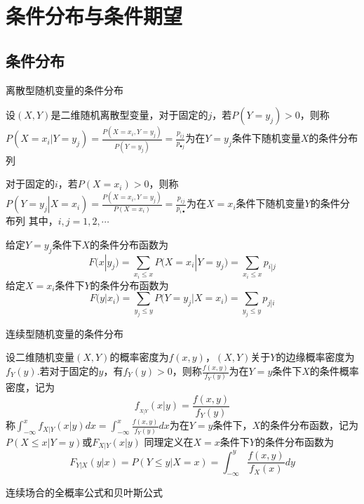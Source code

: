 \section{条件分布与条件期望}
\subsection{条件分布}
离散型随机变量的条件分布
\begin{definition}
    设$(X,Y)$是二维随机离散型变量，对于固定的$j$，若$P(Y=y_j)>0$，则称
$P( \left. {X = {x_i}} \right|Y = {y_j})  = \frac{ P( X = {x_i},Y = {y_j}) }{P( Y = {y_j}) } = \frac{ p_{ij} }{ p_{ \bullet j} }$为在$Y=y_j$条件下随机变量$X$的条件分布列
\end{definition}

对于固定的$i$，若$P(X=x_i)>0$，则称
$P( \left. {Y = {y_j}} \right|X = {x_i})  = \frac{ P( X = {x_i},Y = {y_j}) }{P( X = {x_i}) } = \frac{ p_{ij} }{ p_{ i \bullet} }$为在$X=x_i$条件下随机变量$Y$的条件分布列
其中，$i,j = 1,2, \cdots $

\begin{definition}[离散型随机变量的条件分布函数]
    给定$Y = {y_j}$条件下$X$的条件分布函数为
$$F(x\left| {{y_j})} \right. = \sum\limits_{{x_i} \leqslant x} {P(X = {x_i}\left| {Y = {y_j}) = } \right.} \sum\limits_{{x_i} \leqslant x} {{p_{i\left| j \right.}}} $$
给定$X = {x_i}$条件下$Y$的条件分布函数为
$$F(y\left| {{x_i})} \right. = \sum\limits_{{y_j} \leqslant y} {P(Y = {y_j}\left| {X = {x_i}) = } \right.} \sum\limits_{{y_j} \leqslant y} {{p_{j\left| i \right.}}} $$
    
\end{definition}

连续型随机变量的条件分布
\begin{definition}
    设二维随机变量$(X,Y)$的概率密度为$f(x,y)$，$(X,Y)$关于$Y$的边缘概率密度为${f_Y}(y)$.若对于固定的$y$，有$f_Y(y)>0$，则称$\frac{{f(x,y)}}{{{f_Y}(y)}}$为在$Y=y$条件下$X$的条件概率密度，记为
$${f_{_{\left. X \right|Y}}}(\left. x \right|y) = \frac{{f(x,y)}}{{{f_Y}(y)}}$$
称$\int_{ - \infty }^x {{f_{\left. X \right|Y}}(\left. x \right|y)dx = \int_{ - \infty }^x {\frac{{f(x,y)}}{{{f_Y}(y)}}} } dx$为在$Y=y$条件下，$X$的条件分布函数，记为$P( \left. {X \leqslant x} \right|Y = y) $或$F_{X|Y}(x|y)$
同理定义在$X=x$条件下$Y$的条件分布函数为
$${F_{\left. Y \right|X}}(\left. y \right|x) = P(\left. {Y \leqslant y} \right|X = x)  = \int_{ - \infty }^y {\frac{{f(x,y)}}{{{f_X}(x)}}} dy$$
\end{definition}

连续场合的全概率公式和贝叶斯公式

